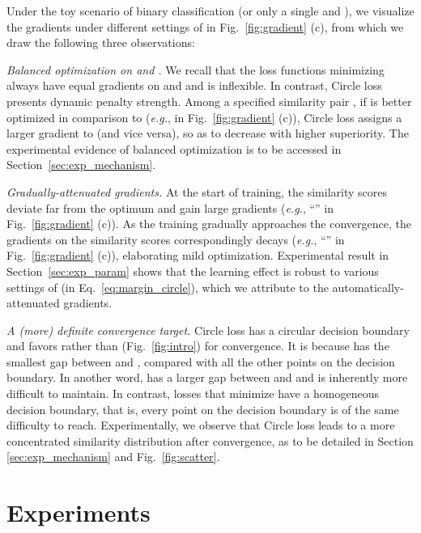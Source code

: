 \documentclass[10pt,twocolumn,letterpaper]{article}
\begin{document}
Under the toy scenario of binary classification (or only a single  and ), we visualize the gradients under different settings of  in Fig.~\ref{fig:gradient} (c), from which we draw the following three observations:

\emph{Balanced optimization on  and .} We recall that the loss functions minimizing  always have equal gradients on  and  and is inflexible. In contrast, Circle loss presents dynamic penalty strength. Among a specified similarity pair , if  is better optimized in comparison to  (\emph{e.g.},  in Fig.~\ref{fig:gradient} (c)), Circle loss assigns a larger gradient to  (and vice versa), so as to decrease  with higher superiority. The experimental evidence of balanced optimization is to be accessed in Section~\ref{sec:exp_mechanism}.

\emph{Gradually-attenuated gradients.} At the start of training, the similarity scores deviate far from the optimum and gain large gradients (\emph{e.g.}, ``'' in Fig.~\ref{fig:gradient} (c)). As the training gradually approaches the convergence, the gradients on the similarity scores correspondingly decays (\emph{e.g.}, ``'' in Fig.~\ref{fig:gradient} (c)), elaborating mild optimization. Experimental result in Section~\ref{sec:exp_param} shows that the learning effect is robust to various settings of  (in Eq.~\ref{eq:margin_circle}), which we attribute to the automatically-attenuated gradients. 

\emph{A (more) definite convergence target.}
Circle loss has a circular decision boundary and favors  rather than  (Fig.~\ref{fig:intro}) for convergence. It is because  has the smallest gap between  and , compared with all the other points on the decision boundary. In another word,  has a larger gap between  and  and is inherently more difficult to maintain. In contrast, losses that minimize  have a homogeneous decision boundary, that is, every point on the decision boundary is of the same difficulty to reach. 
Experimentally, we observe that Circle loss leads to a more concentrated similarity distribution after convergence, as to be detailed in Section \ref{sec:exp_mechanism} and Fig.~\ref{fig:scatter}.




\section{Experiments}
\end{document}

